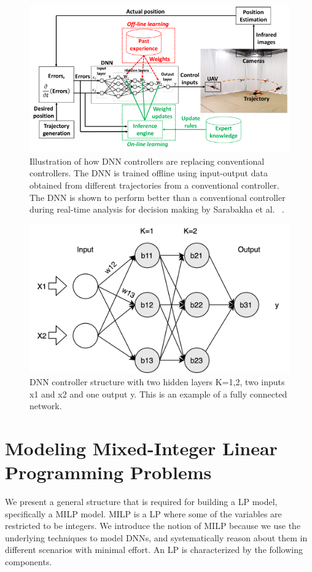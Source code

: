 \begin{figure}
	\centering
	\includegraphics[width=0.7\linewidth]{Images/DNNcontroller}
	\caption{Illustration of how DNN controllers are replacing conventional controllers. The DNN is trained offline using input-output data obtained from different trajectories from a conventional controller. The DNN is shown to perform better than a conventional controller during real-time analysis for decision making by  Sarabakha et al. ~\cite{sarabakha2019online}.}
	\label{fig:dnncontroller}
\end{figure}

\begin{figure}
	\centering
	\includegraphics[width=0.7\linewidth]{Images/DNNstructure}
	\caption[DNN structure]{DNN controller structure with two hidden layers K=1,2, two inputs x1 and x2 and one output y. This is an example of a fully connected network.}
	\label{fig:dnn-controller}
\end{figure}

\section{Modeling Mixed-Integer Linear Programming Problems}
\label{milp}
We present a general structure that is required for building a \ac{LP} model, specifically a \ac{MILP} model.
\ac{MILP} is a \ac{LP} where some of the variables are restricted to be integers. 
We introduce the notion of \ac{MILP} because we use the underlying techniques to model \ac{DNN}s, and systematically reason about them in different scenarios with minimal effort. 
An \ac{LP} is characterized by the following components. 

